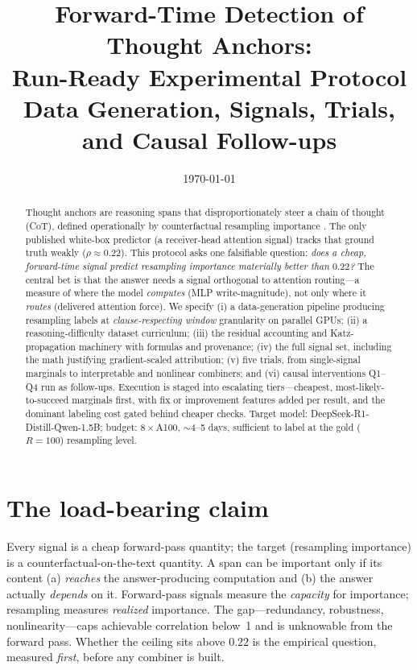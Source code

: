 \documentclass[11pt]{article}
\title{\textbf{Forward-Time Detection of Thought Anchors: \\ Run-Ready Experimental Protocol}\\[0.4em]
\large Data Generation, Signals, Trials, and Causal Follow-ups}
\author{}
\date{\today}
\begin{document}
\maketitle

\begin{abstract}
\noindent
Thought anchors are reasoning spans that disproportionately steer a chain of thought (CoT),
defined operationally by counterfactual resampling importance \cite{bogdan2025thought}. The only
published white-box predictor (a receiver-head attention signal) tracks that ground truth weakly
($\rho\approx0.22$). This protocol asks one falsifiable question: \emph{does a cheap, forward-time
signal predict resampling importance materially better than $0.22$?} The central bet is that the
answer needs a signal orthogonal to attention routing---a measure of where the model
\emph{computes} (MLP write-magnitude), not only where it \emph{routes} (delivered attention force).
We specify (i) a data-generation pipeline producing resampling labels at
\emph{clause-respecting window} granularity on parallel GPUs; (ii) a reasoning-difficulty dataset curriculum; (iii) the residual
accounting and Katz-propagation machinery with formulas and provenance; (iv) the full signal set,
including the math justifying gradient-scaled attribution; (v) five trials, from single-signal
marginals to interpretable and nonlinear combiners; and (vi) causal interventions Q1--Q4 run as
follow-ups. Execution is staged into escalating tiers---cheapest, most-likely-to-succeed marginals
first, with fix or improvement features added per result, and the dominant labeling cost gated behind
cheaper checks. Target model: DeepSeek-R1-Distill-Qwen-1.5B; budget: $8\times$A100, $\sim$4--5 days,
sufficient to label at the gold ($R{=}100$) resampling level.
\end{abstract}

\section{The load-bearing claim}
Every signal is a cheap forward-pass quantity; the target (resampling importance) is a
counterfactual-on-the-text quantity. A span can be important only if its content (a) \emph{reaches}
the answer-producing computation and (b) the answer actually \emph{depends} on it. Forward-pass
signals measure the \emph{capacity} for importance; resampling measures \emph{realized} importance.
The gap---redundancy, robustness, nonlinearity---caps achievable correlation below~1 and is
unknowable from the forward pass. Whether the ceiling sits above $0.22$ is the empirical question,
measured \emph{first}, before any combiner is built.
\end{document}
